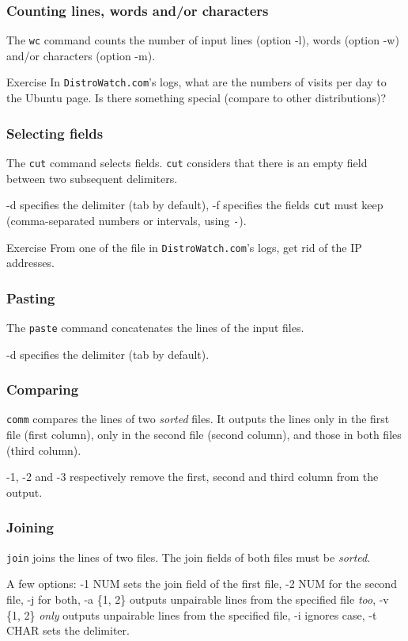 \documentclass{beamer}
\begin{document}
\begin{frame}
  \frametitle{Counting lines, words and/or characters}
  The \texttt{wc} command counts the number of input lines (option
  -l), words (option -w) and/or characters (option -m).

  \vfill
  \pause

  \begin{exampleblock}{Exercise}
    In \texttt{DistroWatch.com}'s logs, what are the numbers of visits
    per day to the Ubuntu page. Is there something special (compare to
    other distributions)?
  \end{exampleblock}
\end{frame}

\begin{frame}
  \frametitle{Selecting fields}
  The \texttt{cut} command selects fields. \texttt{cut} considers that
  there is an empty field between two subsequent delimiters.

  \vfill

  -d specifies the delimiter (tab by default), -f specifies the fields
  \texttt{cut} must keep (comma-separated numbers or intervals, using
  \texttt{-}).

  \vfill
  \pause

  \begin{exampleblock}{Exercise}
    From one of the file in \texttt{DistroWatch.com}'s logs, get rid
    of the IP addresses.
  \end{exampleblock}
\end{frame}

\begin{frame}
  \frametitle{Pasting}
  The \texttt{paste} command concatenates the lines of the input
  files.

  \vfill

  -d specifies the delimiter (tab by default).
\end{frame}

\begin{frame}
  \frametitle{Comparing}
  \texttt{comm} compares the lines of two \emph{sorted} files.  It
  outputs the lines only in the first file (first column), only in the
  second file (second column), and those in both files (third column).

  \vfill

  -1, -2 and -3 respectively remove the first, second and third column
  from the output.
\end{frame}

\begin{frame}
  \frametitle{Joining}
  \texttt{join} joins the lines of two files. The join fields of both
  files must be \emph{sorted}.

  \vfill

  A few options: -1 NUM sets the join field of the first file, -2 NUM
  for the second file, -j for both, -a \{1, 2\} outputs unpairable
  lines from the specified file \emph{too}, -v \{1, 2\} \emph{only}
  outputs unpairable lines from the specified file, -i ignores case,
  -t CHAR sets the delimiter.
\end{frame}
\end{document}
